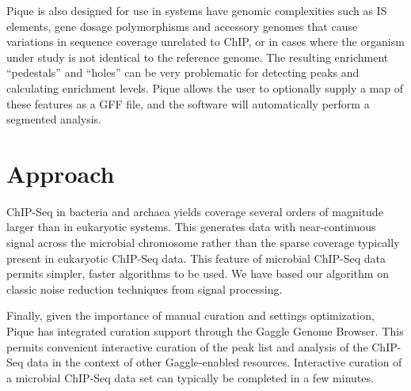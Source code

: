 \documentclass{bioinfo}
\begin{document}
Pique is also designed for use in systems have genomic complexities
such as IS elements, gene dosage polymorphisms and accessory genomes
that cause variations in sequence coverage unrelated to ChIP, or in
cases where the organism under study is not identical to the reference
genome. The resulting enrichment ``pedestals'' and ``holes'' can be
very problematic for detecting peaks and calculating enrichment
levels. Pique allows the user to optionally supply a map of these
features as a GFF file, and the software will automatically perform a
segmented analysis.

\section{Approach}

\noindent ChIP-Seq in bacteria and archaea yields coverage several
orders of magnitude larger than in eukaryotic systems.  This generates
data with near-continuous signal across the microbial chromosome
rather than the sparse coverage typically present in eukaryotic
ChIP-Seq data.  This feature of microbial ChIP-Seq data permits
simpler, faster algorithms to be used. We have based our algorithm on
classic noise reduction techniques from signal processing. 

Finally, given the importance of manual curation and settings
optimization, Pique has integrated curation support through the Gaggle
Genome Browser. This permits convenient interactive curation of the
peak list and analysis of the ChIP-Seq data in the context of other
Gaggle-enabled resources. Interactive curation of a microbial ChIP-Seq
data set can typically be completed in a few minutes. 
\end{document}
